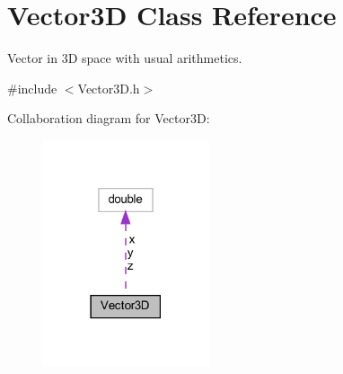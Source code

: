 \hypertarget{classVector3D}{}\section{Vector3D Class Reference}
\label{classVector3D}


Vector in 3D space with usual arithmetics.  




{\ttfamily \#include $<$Vector3\+D.\+h$>$}



Collaboration diagram for Vector3D\+:
\nopagebreak
\begin{figure}[H]
\begin{center}
\leavevmode
\includegraphics[width=138pt]{classVector3D__coll__graph}
\end{center}
\end{figure}
